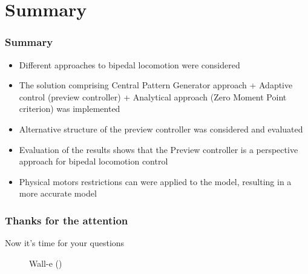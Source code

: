 \documentclass{beamer}
\begin{document}
	\section*{Summary}
	\begin{frame}
		\frametitle{Summary}
		\begin{itemize}
			\item
				Different approaches to bipedal locomotion were considered
			\item
				The solution comprising Central Pattern Generator approach + Adaptive control (preview controller) + Analytical approach (Zero Moment Point criterion) was implemented
			\item
				Alternative structure of the preview controller was considered and evaluated
			\item
				Evaluation of the results shows that the Preview controller is a perspective approach for bipedal locomotion control
			\item
				Physical motors restrictions can were applied to the model, resulting in a more accurate model
		\end{itemize}
	\end{frame}


	\begin{frame}
		\frametitle{Thanks for the attention}
		Now it's time for your questions
		\begin{figure}[h]
			 \caption{Wall-e (\cite{walle})}
		\end{figure}
	\end{frame}
	
	
\end{document}
